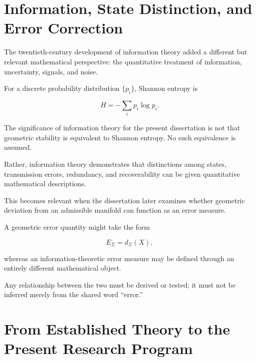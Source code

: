 \documentclass[12pt,oneside]{book}
\begin{document}

\section{Information, State Distinction, and Error Correction}
\label{sec:information-error-history}

The twentieth-century development of information theory added a
different but relevant mathematical perspective: the
quantitative treatment of information, uncertainty, signals,
and noise.

For a discrete probability distribution
\(\{p_i\}\), Shannon entropy is

\begin{equation}
    H
    =
    -
    \sum_i
    p_i
    \log p_i.
    \label{eq:shannon-entropy}
\end{equation}

The significance of information theory for the present
dissertation is not that geometric stability is equivalent to
Shannon entropy. No such equivalence is assumed.

Rather, information theory demonstrates that distinctions among
states, transmission errors, redundancy, and recoverability can
be given quantitative mathematical descriptions.

This becomes relevant when the dissertation later examines
whether geometric deviation from an admissible manifold can
function as an error measure.

A geometric error quantity might take the form

\begin{equation}
    E_{\Sigma}
    =
    d_{\Sigma}(X),
    \label{eq:geometric-error-measure}
\end{equation}

whereas an information-theoretic error measure may be defined
through an entirely different mathematical object.

Any relationship between the two must be derived or tested; it
must not be inferred merely from the shared word ``error.''


\section{From Established Theory to the Present Research Program}
\label{sec:history-to-present-framework}
\end{document}
